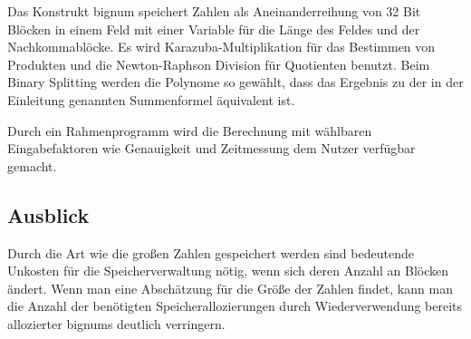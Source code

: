 \documentclass[course=erap]{aspdoc}
\begin{document}
	Das Konstrukt bignum speichert Zahlen als Aneinanderreihung von 32 Bit Blöcken in einem Feld mit einer Variable für die Länge des Feldes und der Nachkommablöcke. Es wird Karazuba-Multiplikation für das Bestimmen von Produkten und die Newton-Raphson Division für Quotienten benutzt. Beim Binary Splitting werden die Polynome so gewählt, dass das Ergebnis zu der in der Einleitung genannten Summenformel äquivalent ist.
	
	Durch ein Rahmenprogramm wird die Berechnung mit wählbaren Eingabefaktoren wie Genauigkeit und Zeitmessung dem Nutzer verfügbar gemacht.
	
	\subsection{Ausblick}
	Durch die Art wie die großen Zahlen gespeichert werden sind bedeutende Unkosten für die Speicherverwaltung nötig, wenn sich deren Anzahl an Blöcken ändert. Wenn man eine Abschätzung für die Größe der Zahlen findet, kann man die Anzahl der benötigten Speicherallozierungen durch Wiederverwendung bereits allozierter bignums deutlich verringern.
	
	
	{}
	
\end{document}
